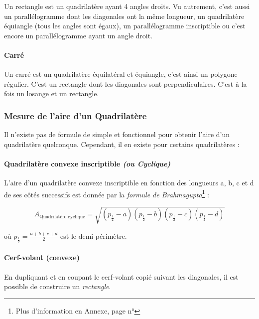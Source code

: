 \documentclass[a4paper, twoside]{article}
\begin{document}
Un rectangle est un quadrilatère ayant 4 angles droits.
Vu autrement, c'est aussi un parallélogramme dont les diagonales ont la même longueur,
un quadrilatère équiangle (tous les angles sont égaux),
un parallélogramme inscriptible ou
c'est encore un parallélogramme ayant un angle droit.

\vspace*{-0.25cm}

\paragraph*{Carré}

Un carré est un quadrilatère équilatéral et équiangle, c'est ainsi un polygone régulier.
C'est un rectangle dont les diagonales sont perpendiculaires.
C'est à la fois un losange et un rectangle.

\subsubsection{Mesure de l'aire d'un Quadrilatère}

Il n'existe pas de formule de simple et fonctionnel pour obtenir l'aire
d'un quadrilatère quelconque. Cependant, il en existe pour certains quadrilatères :

\vspace*{-0.25cm}

\paragraph*{Quadrilatère convexe inscriptible \textit{(ou Cyclique)}}

L'aire d'un quadrilatère convexe inscriptible en fonction des longueurs a, b, c et d de ses
côtés successifs est donnée par la \emph{formule de Brahmagupta}\footnote{Plus d'information en Annexe, page n°\pageref*{formule_de_Brahmagupta}} :

$$ A_{\text{Quadrilatère cyclique}} = \sqrt{(p_{\frac{1}{2}}-a)(p_{\frac{1}{2}}-b)(p_{\frac{1}{2}}-c)(p_{\frac{1}{2}}-d)} $$

où $p_{\frac{1}{2}} = \frac{a + b + c + d}{2}$ est le demi-périmètre.

\vspace*{-0.25cm}

\paragraph*{Cerf-volant (convexe)}

En dupliquant et en coupant le cerf-volant copié suivant les diagonales,
il est possible de construire un \textit{rectangle}.
\end{document}

